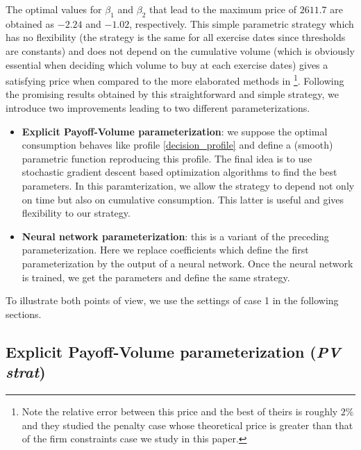 \documentclass{article}
\numberwithin{equation}{section}
\begin{document}

The optimal values for $\beta_1$ and $\beta_2$ that lead to the maximum price of $2611.7$ are obtained as $-2.24$ and $-1.02$, respectively. This simple parametric strategy which has no flexibility (the strategy is the same for all exercise dates since thresholds are constants) and does not depend on the cumulative volume (which is obviously essential when deciding which volume to buy at each exercise dates) gives a satisfying price when compared to the more elaborated methods in \cite{BarreraEsteve2006NumericalMF}\footnote{Note the relative error between this price and the best of theirs is roughly $2\%$ and they studied the penalty case whose theoretical price is greater than that of the firm constraints case we study in this paper.}. Following the promising results obtained by this straightforward and simple strategy, we introduce two improvements leading to two different parameterizations.

\begin{itemize}
	\item \textbf{Explicit Payoff-Volume parameterization}: we suppose the optimal consumption behaves like profile \ref{decision_profile} and define a (smooth) parametric function reproducing this profile. The final idea is to use stochastic gradient descent based optimization algorithms to find the best parameters. In this paramterization, we allow the strategy to depend not only on time but also on cumulative consumption. This latter is useful and gives flexibility to our strategy.
	\item \textbf{Neural network parameterization}: this is a variant of the preceding parameterization. Here we replace coefficients which define the first parameterization by the output of a neural network. Once the neural network is trained, we get the parameters and define the same strategy.
\end{itemize}

To illustrate both points of view, we use the settings of case 1 in the following sections.



\subsection{Explicit Payoff-Volume parameterization (\textit{PV strat})}
\end{document}
